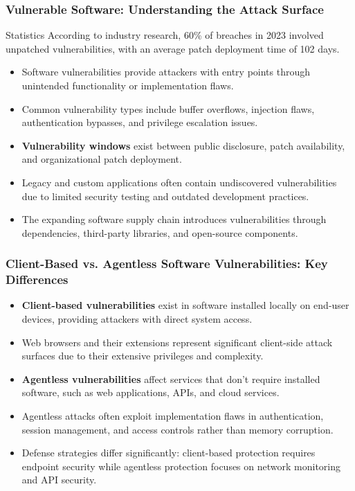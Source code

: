\documentclass{beamer}
\begin{document}
\begin{frame}
    \frametitle{Vulnerable Software: Understanding the Attack Surface}
    
    \begin{block}{Statistics}
        According to industry research, 60\% of breaches in 2023 involved unpatched vulnerabilities, with an average patch deployment time of 102 days.
    \end{block}
    
    \begin{itemize}
        \item Software vulnerabilities provide attackers with entry points through unintended functionality or implementation flaws.
        \item Common vulnerability types include buffer overflows, injection flaws, authentication bypasses, and privilege escalation issues.
        \item \textbf{Vulnerability windows} exist between public disclosure, patch availability, and organizational patch deployment.
        \item Legacy and custom applications often contain undiscovered vulnerabilities due to limited security testing and outdated development practices.
        \item The expanding software supply chain introduces vulnerabilities through dependencies, third-party libraries, and open-source components.
    \end{itemize}
\end{frame}

\begin{frame}
    \frametitle{Client-Based vs. Agentless Software Vulnerabilities: Key Differences}
    
    \begin{itemize}
        \item \textbf{Client-based vulnerabilities} exist in software installed locally on end-user devices, providing attackers with direct system access.
        \item Web browsers and their extensions represent significant client-side attack surfaces due to their extensive privileges and complexity.
        \item \textbf{Agentless vulnerabilities} affect services that don't require installed software, such as web applications, APIs, and cloud services.
        \item Agentless attacks often exploit implementation flaws in authentication, session management, and access controls rather than memory corruption.
        \item Defense strategies differ significantly: client-based protection requires endpoint security while agentless protection focuses on network monitoring and API security.
    \end{itemize}
\end{frame}
\end{document}
